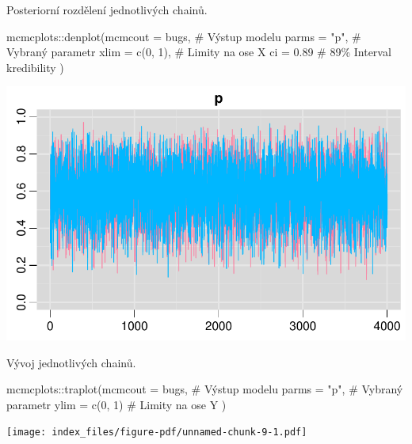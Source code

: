 \documentclass[
  11pt,
  a4paper]{report}
\newenvironment{Shaded}{\begin{snugshade}}{\end{snugshade}}
\newcommand{\AttributeTok}[1]{\textcolor[rgb]{0.40,0.45,0.13}{#1}}
\newcommand{\CommentTok}[1]{\textcolor[rgb]{0.37,0.37,0.37}{#1}}
\newcommand{\DecValTok}[1]{\textcolor[rgb]{0.68,0.00,0.00}{#1}}
\newcommand{\FloatTok}[1]{\textcolor[rgb]{0.68,0.00,0.00}{#1}}
\newcommand{\FunctionTok}[1]{\textcolor[rgb]{0.28,0.35,0.67}{#1}}
\newcommand{\NormalTok}[1]{\textcolor[rgb]{0.00,0.23,0.31}{#1}}
\newcommand{\SpecialCharTok}[1]{\textcolor[rgb]{0.37,0.37,0.37}{#1}}
\newcommand{\StringTok}[1]{\textcolor[rgb]{0.13,0.47,0.30}{#1}}
\begin{document}
Posteriorní rozdělení jednotlivých chainů.

\begin{Shaded}
\begin{Highlighting}[]
\NormalTok{mcmcplots}\SpecialCharTok{::}\FunctionTok{denplot}\NormalTok{(}\AttributeTok{mcmcout =}\NormalTok{ bugs, }\CommentTok{\# Výstup modelu}
                   \AttributeTok{parms =} \StringTok{"p"}\NormalTok{,    }\CommentTok{\# Vybraný parametr}
                   \AttributeTok{xlim =} \FunctionTok{c}\NormalTok{(}\DecValTok{0}\NormalTok{, }\DecValTok{1}\NormalTok{), }\CommentTok{\# Limity na ose X}
                   \AttributeTok{ci =} \FloatTok{0.89}       \CommentTok{\# 89\% Interval kredibility}
\NormalTok{)}
\end{Highlighting}
\end{Shaded}

\includegraphics{index_files/figure-pdf/unnamed-chunk-8-1.pdf}

Vývoj jednotlivých chainů.

\begin{Shaded}
\begin{Highlighting}[]
\NormalTok{mcmcplots}\SpecialCharTok{::}\FunctionTok{traplot}\NormalTok{(}\AttributeTok{mcmcout =}\NormalTok{ bugs, }\CommentTok{\# Výstup modelu}
                   \AttributeTok{parms =} \StringTok{"p"}\NormalTok{,    }\CommentTok{\# Vybraný parametr}
                   \AttributeTok{ylim =} \FunctionTok{c}\NormalTok{(}\DecValTok{0}\NormalTok{, }\DecValTok{1}\NormalTok{)  }\CommentTok{\# Limity na ose Y}
\NormalTok{)}
\end{Highlighting}
\end{Shaded}

\texttt{[image: index\_files/figure-pdf/unnamed-chunk-9-1.pdf]}
\end{document}
